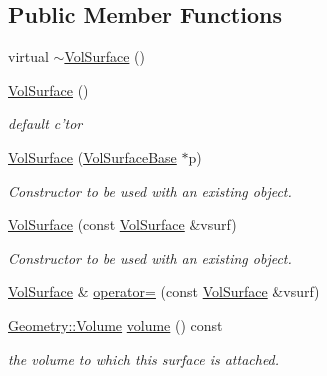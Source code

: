 \subsection*{Public Member Functions}
\begin{DoxyCompactItemize}
\item 
virtual \hyperlink{class_d_d4hep_1_1_d_d_rec_1_1_vol_surface_a2e875aa0d3e673d9c07f6047f3e7d0cb}{$\sim$VolSurface} ()
\item 
\hyperlink{class_d_d4hep_1_1_d_d_rec_1_1_vol_surface_a4f1411058c69312c7107b4c5d5e5fc28}{VolSurface} ()
\begin{DoxyCompactList}\small\item\em default c'tor \item\end{DoxyCompactList}\item 
\hyperlink{class_d_d4hep_1_1_d_d_rec_1_1_vol_surface_a95bfde0154e3651826df0760b2aba552}{VolSurface} (\hyperlink{class_d_d4hep_1_1_d_d_rec_1_1_vol_surface_base}{VolSurfaceBase} $\ast$p)
\begin{DoxyCompactList}\small\item\em Constructor to be used with an existing object. \item\end{DoxyCompactList}\item 
\hyperlink{class_d_d4hep_1_1_d_d_rec_1_1_vol_surface_adf64ad2a3576cca241d5f627e26c619c}{VolSurface} (const \hyperlink{class_d_d4hep_1_1_d_d_rec_1_1_vol_surface}{VolSurface} \&vsurf)
\begin{DoxyCompactList}\small\item\em Constructor to be used with an existing object. \item\end{DoxyCompactList}\item 
\hyperlink{class_d_d4hep_1_1_d_d_rec_1_1_vol_surface}{VolSurface} \& \hyperlink{class_d_d4hep_1_1_d_d_rec_1_1_vol_surface_a3572914428d729854bc7c55466ddb788}{operator=} (const \hyperlink{class_d_d4hep_1_1_d_d_rec_1_1_vol_surface}{VolSurface} \&vsurf)
\item 
\hyperlink{class_d_d4hep_1_1_geometry_1_1_volume}{Geometry::Volume} \hyperlink{class_d_d4hep_1_1_d_d_rec_1_1_vol_surface_a05dae0ef8a5e373148eb8ec788c2797f}{volume} () const 
\begin{DoxyCompactList}\small\item\em the volume to which this surface is attached. \item\end{DoxyCompactList}\item 

\end{DoxyCompactItemize}
